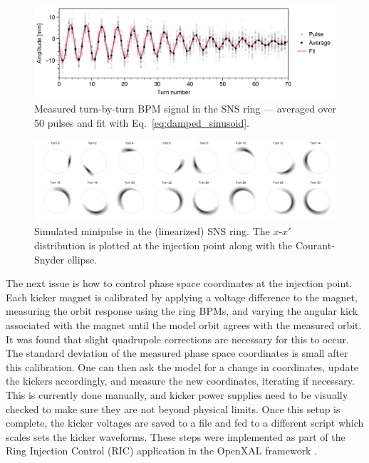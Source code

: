 %
\begin{figure}[!p]
    \centering
    \includegraphics[width=\textwidth]{Images/chapter1/bpm_avg.png}
    \caption{Measured turn-by-turn BPM signal in the SNS ring — averaged over 50 pulses and fit with Eq.~\eqref{eq:damped_sinusoid}.}
    \label{fig:bpm_avg}
\end{figure}
%
%
\begin{figure}
    \centering
    \includegraphics[width=\textwidth]{Images/chapter1/minipulse_chromaticity_black.png}
    \caption{Simulated minipulse in the (linearized) SNS ring. The $x$-$x'$ distribution is plotted at the injection point along with the Courant-Snyder ellipse.}
    \label{fig:minipulse}
\end{figure}
%

The next issue is how to control phase space coordinates at the injection point. Each kicker magnet is calibrated by applying a voltage difference to the magnet, measuring the orbit response using the ring BPMs, and varying the angular kick associated with the magnet until the model orbit agrees with the measured orbit. It was found that slight quadrupole corrections are necessary for this to occur. The standard deviation of the measured phase space coordinates is small after this calibration. One can then ask the model for a change in coordinates, update the kickers accordingly, and measure the new coordinates, iterating if necessary. This is currently done manually, and kicker power supplies need to be visually checked to make sure they are not beyond physical limits. Once this setup is complete, the kicker voltages are saved to a file and fed to a different script which scales sets the kicker waveforms. These steps were implemented as part of the Ring Injection Control (RIC) application in the OpenXAL framework \cite{Milas2021}. 

